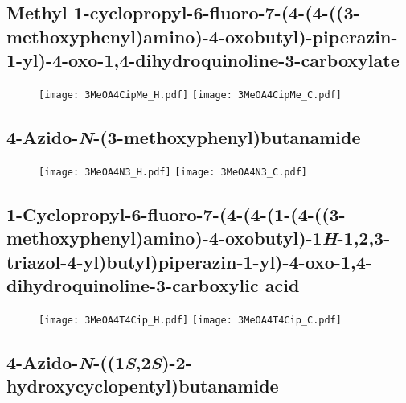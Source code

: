 \subsection{Methyl 1\hyp{}cyclopropyl\hyp{}6\hyp{}fluoro\hyp{}7\hyp{}(4\hyp{}(4\hyp{}((3\hyp{}methoxyphenyl)amino)\hyp{}4\hyp{}oxobutyl)\hyp{}piperazin\hyp{}1\hyp{}yl)\hyp{}4\hyp{}oxo\hyp{}1,4\hyp{}dihydroquinoline\hyp{}3\hyp{}carboxylate }

\begin{figure}[H]
	\centering
		\texttt{[image: 3MeOA4CipMe\_H.pdf]}
		\texttt{[image: 3MeOA4CipMe\_C.pdf]}
\end{figure}

\subsection{4\hyp{}Azido\hyp{}\textit{N}\hyp{}(3\hyp{}methoxyphenyl)butanamide }

\begin{figure}[H]
	\centering
		\texttt{[image: 3MeOA4N3\_H.pdf]}
		\texttt{[image: 3MeOA4N3\_C.pdf]}
\end{figure}

\subsection{1\hyp{}Cyclopropyl\hyp{}6\hyp{}fluoro\hyp{}7\hyp{}(4\hyp{}(4\hyp{}(1\hyp{}(4\hyp{}((3\hyp{}methoxyphenyl)amino)\hyp{}4\hyp{}oxobutyl)\hyp{}1\textit{H}\hyp{}1,2,3\hyp{}triazol\hyp{}4\hyp{}yl)\allowbreak butyl)piperazin\hyp{}1\hyp{}yl)\hyp{}4\hyp{}oxo\hyp{}1,4\hyp{}dihydroquinoline\hyp{}3\hyp{}carboxylic acid }

\begin{figure}[H]
	\centering
		\texttt{[image: 3MeOA4T4Cip\_H.pdf]}
		\texttt{[image: 3MeOA4T4Cip\_C.pdf]}
\end{figure}

\subsection{4\hyp{}Azido\hyp{}\textit{N}\hyp{}((1\textit{S},2\textit{S})\hyp{}2\hyp{}hydroxycyclopentyl)butanamide }


